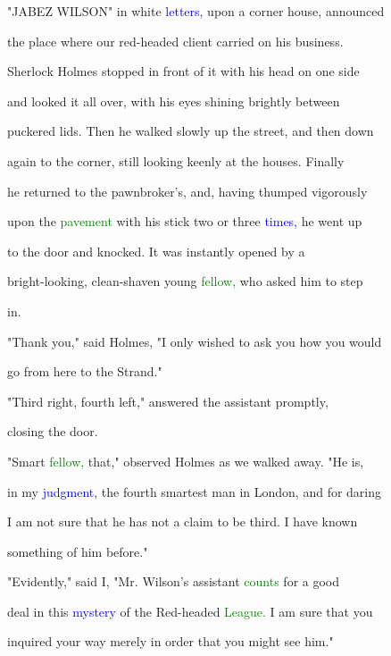  "JABEZ WILSON" in \textcolor{BurntOrange}{white} \textcolor{blue}{letters,} upon a corner house, announced

 the place where our red-headed client carried on his business.

 Sherlock Holmes stopped in front of it with his head on one side

 and looked it all over, with his eyes shining brightly between

 puckered lids. Then he walked slowly up the street, and then down

 again to the corner, still looking keenly at the houses. \textcolor{BurntOrange}{Finally}

 he returned to the pawnbroker's, and, having thumped vigorously

 upon the \textcolor{green}{pavement} with his stick two or three \textcolor{blue}{times,} he went up

 to the door and knocked. It was instantly opened by a

 bright-looking, clean-shaven \textcolor{BurntOrange}{young} \textcolor{green}{fellow,} who asked him to step

 in.



 "Thank you," said Holmes, "I only wished to ask you how you would

 go from here to the Strand."



 "Third right, fourth left," answered the assistant promptly,

 closing the door.



 "Smart \textcolor{green}{fellow,} that," observed Holmes as we walked away. "He is,

 in my \textcolor{blue}{judgment,} the fourth smartest man in London, and for \textcolor{BurntOrange}{daring}

 I am not sure that he has not a claim to be third. I have known

 something of him before."



 "Evidently," said I, "Mr. Wilson's assistant \textcolor{green}{counts} for a \textcolor{BurntOrange}{good}

 \textcolor{BurntOrange}{deal} in this \textcolor{blue}{mystery} of the Red-headed \textcolor{green}{League.} I am sure that you

 inquired your way merely in order that you might see him."



